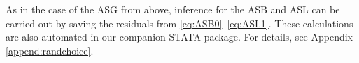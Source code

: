\documentclass[oneside,11pt]{article}
\begin{document}
As in the case of the ASG from above, inference for the ASB and ASL can be carried out by saving the residuals from \eqref{eq:ASB0}--\eqref{eq:ASL1}. 
These calculations are also automated in our companion STATA package.
For details, see Appendix \ref{append:randchoice}.







\end{document}
